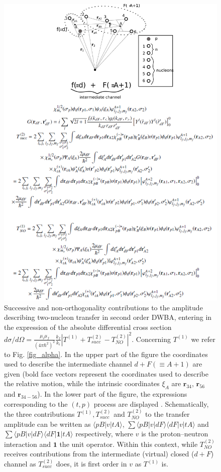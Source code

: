 \begin{figure}
\centerline{\includegraphics*[width=\textwidth,angle=0]{nutshell/figs/fig_beta.pdf}}
\caption{Successive and non-orthogonality contributions to the  amplitude describing two-nucleon transfer in second order DWBA, entering in the expression of the absolute differential cross section $d\sigma/d\Omega=\tfrac{\mu_i\mu_f}{(4\pi\hbar^2)^2}\tfrac{k_f}{k_i}\left|T^{(1)}+T_{succ}^{(2)}-T^{(2)}_{NO}\right|^2$. Concerning $T^{(1)}$ we refer to Fig. \ref{fig_alpha}. In the upper part of the figure the coordinates used to describe the intermediate channel $d+F(\equiv A+1)$ are given (bold face vectors represent the coordinates used to describe the relative motion, while the intrinsic coordinates $\xi_A$ are $\mathbf r_{34}$, $\mathbf r_{56}$ and $\mathbf r_{34-56}$). In the lower part of the figure, the  expressions corresponding to the $(t,p)$ process are displayed \citep{Potel:13b}. Schematically, the three contributions $T^{(1)}, T^{(2)}_{succ}$ and $T^{(2)}_{NO}$ to the transfer amplitude can be written as $\langle pB|v|tA\rangle$, $\sum \langle pB|v|dF\rangle\langle dF|v|tA\rangle$ and $\sum \langle pB|v|dF\rangle\langle dF| \mathbf{1}|tA\rangle$ respectively, where $v$ is the proton--neutron interaction and $\mathbf 1$ the unit operator. Within this context, while $T^{(2)}_{NO}$ receives contributions from the intermediate (virtual) closed ($d+F$) channel as $T^{(2)}_{succ}$ does, it is first order in $v$ as $T^{(1)}$ is.}\label{fig_beta}
\end{figure}
